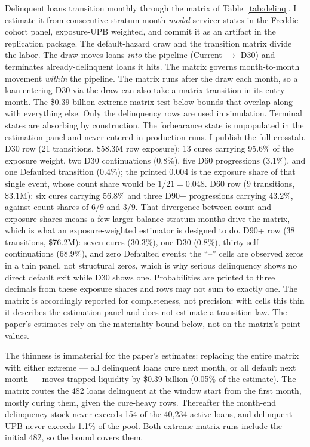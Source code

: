 \documentclass[12pt]{article}
\begin{document}
Delinquent loans transition monthly through the matrix of Table~\ref{tab:delinq}. I estimate it from consecutive stratum-month \emph{modal} servicer states in the Freddie cohort panel, exposure-UPB weighted, and commit it as an artifact in the replication package. The default-hazard draw and the transition matrix divide the labor. The draw moves loans \emph{into} the pipeline (Current $\to$ D30) and terminates already-delinquent loans it hits. The matrix governs month-to-month movement \emph{within} the pipeline. The matrix runs after the draw each month, so a loan entering D30 via the draw can also take a matrix transition in its entry month. The \$0.39 billion extreme-matrix test below bounds that overlap along with everything else. Only the delinquency rows are used in simulation. Terminal states are absorbing by construction. The forbearance state is unpopulated in the estimation panel and never entered in production runs.
I publish the full crosstab. D30 row (21 transitions, \$58.3M row exposure): 13 cures carrying 95.6\% of the exposure weight, two D30 continuations (0.8\%), five D60 progressions (3.1\%), and one Defaulted transition (0.4\%); the printed 0.004 is the exposure share of that single event, whose count share would be $1/21 = 0.048$. D60 row (9 transitions, \$3.1M): six cures carrying 56.8\% and three D90+ progressions carrying 43.2\%, against count shares of $6/9$ and $3/9$. That divergence between count and exposure shares means a few larger-balance stratum-months drive the matrix, which is what an exposure-weighted estimator is designed to do. D90+ row (38 transitions, \$76.2M): seven cures (30.3\%), one D30 (0.8\%), thirty self-continuations (68.9\%), and zero Defaulted events; the ``--'' cells are observed zeros in a thin panel, not structural zeros, which is why serious delinquency shows no direct default exit while D30 shows one. Probabilities are printed to three decimals from these exposure shares and rows may not sum to exactly one. The matrix is accordingly reported for completeness, not precision: with cells this thin it describes the estimation panel and does not estimate a transition law. The paper's estimates rely on the materiality bound below, not on the matrix's point values.

The thinness is immaterial for the paper's estimates: replacing the entire matrix with either extreme --- all delinquent loans cure next month, or all default next month --- moves trapped liquidity by \$0.39 billion (0.05\% of the estimate). The matrix routes the 482 loans delinquent at the window start from the first month, mostly curing them, given the cure-heavy rows. Thereafter the month-end delinquency stock never exceeds 154 of the 40,234 active loans, and delinquent UPB never exceeds 1.1\% of the pool. Both extreme-matrix runs include the initial 482, so the bound covers them.
\end{document}

